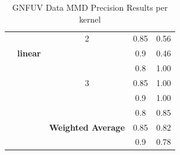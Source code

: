 \documentclass{mpaper}
\begin{document}
\begin{table}[]
\begin{tabular}{|l|c|ccc|}
                                            &                 & \multicolumn{1}{c|}{2}                         & \multicolumn{1}{c|}{0.85}               & 0.56               \\
                                            & \textbf{linear} & \multicolumn{1}{c|}{}                          & \multicolumn{1}{c|}{0.9}                & 0.46               \\ \cline{3-5} 
                                            &                 & \multicolumn{1}{c|}{}                          & \multicolumn{1}{c|}{0.8}                & 1.00               \\
                                            &                 & \multicolumn{1}{c|}{3}                         & \multicolumn{1}{c|}{0.85}               & 1.00               \\
                                            &                 & \multicolumn{1}{c|}{}                          & \multicolumn{1}{c|}{0.9}                & 1.00               \\ \cline{3-5} 
                                            &                 & \multicolumn{1}{l|}{}                          & \multicolumn{1}{c|}{0.8}                & 0.85               \\
                                            &                 & \multicolumn{1}{c|}{\textbf{Weighted Average}} & \multicolumn{1}{c|}{0.85}               & 0.82               \\
                                            &                 & \multicolumn{1}{l|}{}                          & \multicolumn{1}{c|}{0.9}                & 0.78               \\ \hline
\end{tabular}
\caption{\label{tab:gnfuv_mmd_precision_per_kernel} GNFUV Data MMD Precision Results per kernel}
\end{table}
\end{document}
